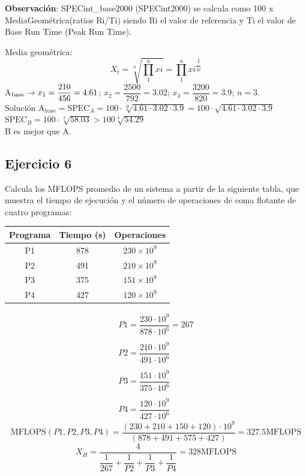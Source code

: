 \noindent
\textbf{Observación}: SPECint\_base2000 (SPECint2000) se calcula como 100 x MediaGeométrica(ratios Ri/Ti) siendo Ri el valor de referencia y Ti el valor de Base Run Time (Peak Run Time).
\begin{tcolorbox}[colback=white,colframe=cyan!50!black,fonttitle=\bfseries]
Media geométrica:
\[
X_t=\sqrt[n]{\prod_1^n xi}=\prod_1^n xi^{\dfrac{1}{w}}
\]
A$_{\text{base}}\rightarrow x_1=\dfrac{210}{456}=4.61$; $x_2=\dfrac{2500}{792}=3.02$; $x_3=\dfrac{3200}{820}=3.9$; $n=3$.\\
Solución A$_{\text{base}}=\text{SPEC}_A=100\cdot\sqrt[B]{4.61\cdot 3.02\cdot 3.9}=100\cdot\sqrt{4.61\cdot 3.02\cdot 3.9}$\\
$\text{SPEC}_B=100\cdot\sqrt[3]{58.03}>100\sqrt[3]{54.29}$\\
B es mejor que A.
\end{tcolorbox}
\subsection{Ejercicio 6}
\noindent
Calcula los MFLOPS promedio de un sistema a partir de la siguiente tabla, que muestra el tiempo de ejecución y el número de operaciones de coma flotante de cuatro programas:
\begin{table}[H]
\centering
\begin{tabular}{|c|c|c|}
\hline
\textbf{Programa} & \textbf{Tiempo (s)} & \textbf{Operaciones} \\ \hline
P1                & 878                 & $230\times10^9$               \\ \hline
P2                & 491                 & $210\times10^9$               \\ \hline
P3                & 375                 & $151\times10^9$               \\ \hline
P4                & 427                 & $120\times10^9$               \\ \hline
\end{tabular}
\end{table}
\begin{tcolorbox}[colback=white,colframe=cyan!50!black,fonttitle=\bfseries]
\[\left.\begin{array}{llll}
P1=\dfrac{230\cdot 10^9}{878\cdot 10^6}=267\\\\
P2=\dfrac{210\cdot 10^9}{491\cdot 10^6}\\\\
P3=\dfrac{151\cdot 10^9}{375\cdot 10^6}\\\\
P4=\dfrac{120\cdot 10^9}{427\cdot 10^6}
\end{array}\right.
\]
\[
\text{MFLOPS}(P1,P2,P3,P4)=\dfrac{(230+210+150+120)\cdot 10^9}{(878+491+575+427)}=327.5\text{MFLOPS}
\]
\[
X_H=\dfrac{4}{\dfrac{1}{267}+\dfrac{1}{P2}+\dfrac{1}{P3}+\dfrac{1}{P4}}=328\text{MFLOPS}
\]
\end{tcolorbox}
